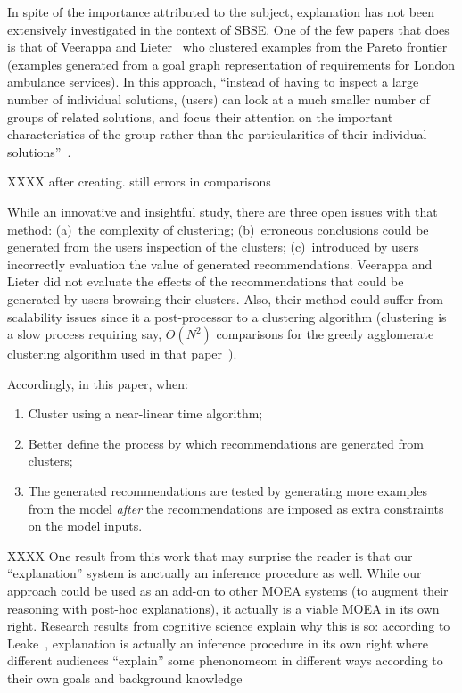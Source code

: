 \documentclass[runningheads]{llncs}
\newcommand{\be}{\begin{enumerate}}
\newcommand{\ee}{\end{enumerate}}
\begin{document}
In spite of the importance attributed to the subject,
explanation has not been extensively investigated in the context of SBSE.
One of the few papers that does is that of 
 Veerappa and Lieter~\cite{veerappa11} who
clustered examples from the Pareto
frontier (examples generated from a goal graph representation of requirements
for London ambulance services). In this approach,
``instead of having to inspect a large
number of individual solutions, (users) can look at a
much smaller number of groups of related solutions,
and focus their attention on the important
characteristics of the group rather than the
particularities of their individual solutions''~\cite{veerappa11}. 

XXXX after creating. still errors in comparisons

While an innovative and insightful study, there
are three open issues with that method:  (a)~the complexity
of clustering; (b)~erroneous conclusions could be generated from the users 
inspection of the clusters; (c)~introduced by users
incorrectly evaluation the value of generated recommendations.
 Veerappa and Lieter did not evaluate the effects
of the recommendations that could be generated by users browsing their
clusters. 
Also, their method could suffer from scalability issues since it
a post-processor
to a clustering algorithm (clustering is a slow process  requiring
 say, $O(N^2)$ comparisons
for the greedy agglomerate clustering algorithm used in that paper~\cite{koc11b}).

Accordingly, in this paper, when:
\be
\item Cluster using a near-linear time algorithm;
\item Better define the process by which recommendations are generated
      from clusters;
\item The generated recommendations are tested by generating more
examples from the model {\em after} the recommendations are imposed
as extra constraints on the model inputs.
\ee

XXXX
One result from this work that may surprise the reader is that our ``explanation'' system is anctually
an inference procedure as well.
While our approach could be used as an add-on to other MOEA systems (to augment their reasoning with post-hoc explanations),
it actually is a viable MOEA in its own right. Research results from cognitive science explain why this is so: 
according to Leake~\cite{XXX}, explanation is actually an inference procedure in its own right where different
audiences ``explain'' some phenonomeom in different ways according to their own goals and background knowledge
\end{document}
